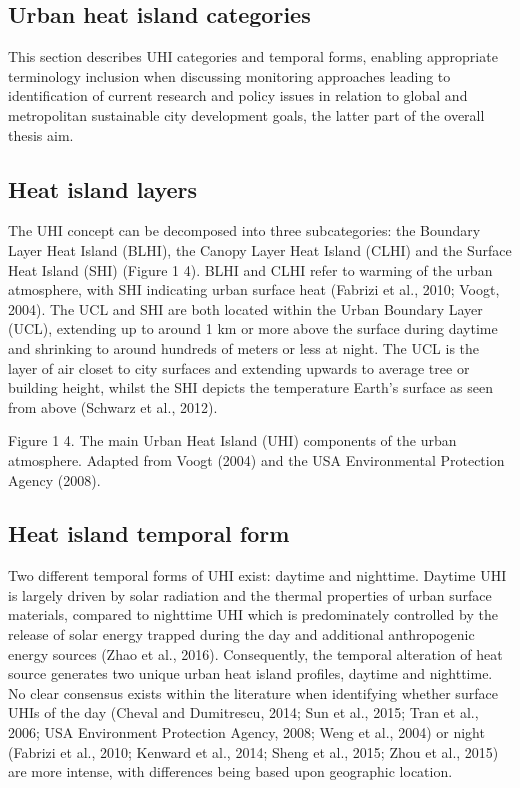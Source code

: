 \documentclass[]{book}
\begin{document}
\subsection{Urban heat island
categories}\label{urban-heat-island-categories}

This section describes UHI categories and temporal forms, enabling
appropriate terminology inclusion when discussing monitoring approaches
leading to identification of current research and policy issues in
relation to global and metropolitan sustainable city development goals,
the latter part of the overall thesis aim.

\subsection{Heat island layers}\label{heat-island-layers}

The UHI concept can be decomposed into three subcategories: the Boundary
Layer Heat Island (BLHI), the Canopy Layer Heat Island (CLHI) and the
Surface Heat Island (SHI) (Figure 1 4). BLHI and CLHI refer to warming
of the urban atmosphere, with SHI indicating urban surface heat (Fabrizi
et al., 2010; Voogt, 2004). The UCL and SHI are both located within the
Urban Boundary Layer (UCL), extending up to around 1 km or more above
the surface during daytime and shrinking to around hundreds of meters or
less at night. The UCL is the layer of air closet to city surfaces and
extending upwards to average tree or building height, whilst the SHI
depicts the temperature Earth's surface as seen from above (Schwarz et
al., 2012).

Figure 1 4. The main Urban Heat Island (UHI) components of the urban
atmosphere. Adapted from Voogt (2004) and the USA Environmental
Protection Agency (2008).

\subsection{Heat island temporal form}\label{heat-island-temporal-form}

Two different temporal forms of UHI exist: daytime and nighttime.
Daytime UHI is largely driven by solar radiation and the thermal
properties of urban surface materials, compared to nighttime UHI which
is predominately controlled by the release of solar energy trapped
during the day and additional anthropogenic energy sources (Zhao et al.,
2016). Consequently, the temporal alteration of heat source generates
two unique urban heat island profiles, daytime and nighttime. No clear
consensus exists within the literature when identifying whether surface
UHIs of the day (Cheval and Dumitrescu, 2014; Sun et al., 2015; Tran et
al., 2006; USA Environment Protection Agency, 2008; Weng et al., 2004)
or night (Fabrizi et al., 2010; Kenward et al., 2014; Sheng et al.,
2015; Zhou et al., 2015) are more intense, with differences being based
upon geographic location.
\end{document}
